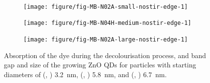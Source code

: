 \documentclass[9pt,twoside,twocolumn]{article}\usepackage{knitr}
\begin{document}
\begin{refsection}
\begin{figure}[tbp]
\begin{subfigure}[b]{0.33\linewidth}
\begin{knitrout}
{}


\end{knitrout}
\end{subfigure}\\%
\begin{subfigure}[b]{0.33\linewidth}
\caption{}%
\label{fig:MB-N02A-small-nostir-edge}
\begin{knitrout}\footnotesize
{}\color{fgcolor}

{\centering \texttt{[image: figure/fig-MB-N02A-small-nostir-edge-1]} 

}


\end{knitrout}
\end{subfigure}%
\hfill%
\begin{subfigure}[b]{0.33\linewidth}
\caption{}%
\label{fig:MB-N04H-medium-nostir-edge}
\begin{knitrout}\footnotesize
{}\color{fgcolor}

{\centering \texttt{[image: figure/fig-MB-N04H-medium-nostir-edge-1]} 

}


\end{knitrout}
\end{subfigure}%
\hfill%
\begin{subfigure}[b]{0.33\linewidth}
\caption{}%
\label{fig:MB-N02A-large-nostir-edge}
\begin{knitrout}\footnotesize
{}\color{fgcolor}

{\centering \texttt{[image: figure/fig-MB-N02A-large-nostir-edge-1]} 

}


\end{knitrout}
\end{subfigure}
%
\caption{Absorption of the dye during the decolourisation process, and band gap and size of the growing ZnO QDs for particles with starting diameters of 
(, ) \qty{3.2}{\nm}, 
(, ) \qty{5.8}{\nm}, and 
(, ) \qty{6.7}{\nm}.}
\label{fig:MB-panels-nostir-photodegradation}
\end{figure}


\begin{figure}[tbp]
\centering
\begin{knitrout}\footnotesize
{}\color{fgcolor}


\end{knitrout}
\end{figure}
\end{refsection}
\end{document}
